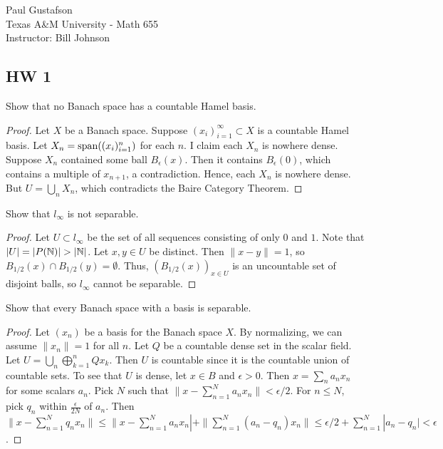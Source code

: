 \documentclass{article}
\begin{document}
\noindent Paul Gustafson\\
\noindent Texas A\&M University - Math 655\\ 
\noindent Instructor: Bill Johnson

\subsection*{HW 1}
 Show that no Banach space has a countable Hamel basis.
\begin{proof}
Let $X$ be a Banach space.  Suppose $(x_i)_{i=1}^\infty \subset X$ is a countable Hamel basis.  Let $X_n = \operatorname{span}((x_i)_{i=1}^n)$ for each $n$.  I claim each $X_n$ is nowhere dense. Suppose $X_n$ contained some ball $B_\epsilon(x)$. Then it contains $B_\epsilon(0)$, which contains a multiple of $x_{n+1}$, a contradiction.  Hence, each $X_n$ is nowhere dense.  But $U = \bigcup_n X_n$, which contradicts the Baire Category Theorem.
\end{proof}


 Show that $l_\infty$ is not separable.
\begin{proof}
Let $U \subset l_\infty$ be the set of all sequences consisting of only $0$ and $1$.  Note that $|U| = |P(\mathbb{N})| > |\mathbb{N}| $.  Let $x,y \in U$ be distinct. Then $\|x - y \| = 1$, so $B_{1/2}(x) \cap B_{1/2}(y) = \emptyset$.  Thus, $(B_{1/2}(x))_{x\in U}$ is an uncountable set of disjoint balls, so $l_\infty$ cannot be separable.
\end{proof}


 Show that every Banach space with a basis is separable.
\begin{proof}
Let $(x_n)$ be a basis for the Banach space $X$. By normalizing, we can assume $\|x_n\| = 1$ for all $n$. Let $Q$ be a countable dense set in the scalar field.  Let $U = \bigcup_n \bigoplus_{k=1}^n Q x_k$. Then $U$ is countable since it is the countable union of countable sets.  To see that $U$ is dense, let $x \in B$ and $\epsilon > 0$. Then $x = \sum_n a_n x_n$ for some scalars $a_n$. Pick $N$ such that $\|x - \sum_{n=1}^N a_n x_n\| < \epsilon/2$.  For $n \le N$, pick $q_n$ within $\frac \epsilon {2N}$  of $a_n$.  Then $ \|x - \sum_{n=1}^N q_n x_n\| \le \|x - \sum_{n=1}^N a_n x_n| + \|\sum_{n=1}^N (a_n - q_n)x_n\| 
\le \epsilon/2 + \sum_{n=1}^N |a_n - q_n| < \epsilon$.
\end{proof}
\end{document}

